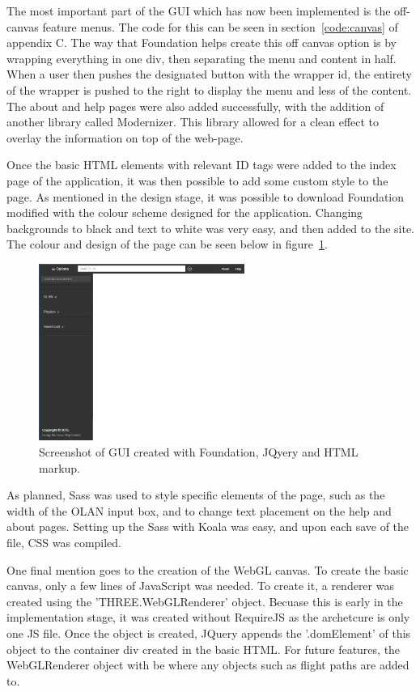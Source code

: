 The most important part of the GUI which has now been implemented is the off-canvas feature menus. The code for this can be seen in section~\ref{code:canvas} of appendix C. The way that Foundation helps create this off canvas option is by wrapping everything in one div, then separating the menu and content in half. When a user then pushes the designated button with the wrapper id, the entirety of the wrapper is pushed to the right to display the menu and less of the content. The about and help pages were also added successfully, with the addition of another library called Modernizer. This library allowed for a clean effect to overlay the information on top of the web-page.

Once the basic HTML elements with relevant ID tags were added to the index page of the application, it was then possible to add some custom style to the page. As mentioned in the design stage, it was possible to download Foundation modified with the colour scheme designed for the application. Changing backgrounds to black and text to white was very easy, and then added to the site. The colour and design of the page can be seen below in figure~\ref{fig:newgui}.

\begin{figure}[h]
  \centering
      \includegraphics[width=0.6\textwidth]{images/desktopProgress.png}
  \caption{Screenshot of GUI created with Foundation, JQyery and HTML markup.}
  \label{fig:newgui}
\end{figure}

As planned, Sass was used to style specific elements of the page, such as the width of the OLAN input box, and to change text placement on the help and about pages. Setting up the Sass with Koala was easy, and upon each save of the file, CSS was compiled. 

One final mention goes to the creation of the WebGL canvas. To create the basic canvas, only a few lines of JavaScript was needed. To create it, a renderer was created using  the 'THREE.WebGLRenderer' object. Becuase this is early in the implementation stage, it was created without RequireJS as the archetcure is only one JS file. Once the object is created, JQuery appends the '.domElement' of this object to the container div created in the basic HTML. For future features, the WebGLRenderer object with be where any objects such as flight paths are added to.

